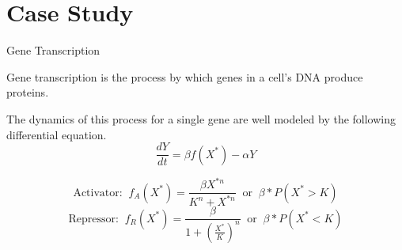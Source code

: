\documentclass{beamer}
\begin{document}
\section{Case Study}

\begin{frame}{Gene Transcription}
    \begin{large}
        Gene transcription is the process by which genes in a cell’s DNA produce proteins.

        \vspace*{0.125in}
        The dynamics of this process for a single gene are well modeled by the following differential equation.
        $$\frac{dY}{dt}=\beta f(X^*) - \alpha Y$$

        $$\text{Activator: } \ f_A(X^*)=\frac{\beta X^{*n}}{K^n + X^{*n}} \ \text{ or } \ \beta * P(X^* > K)$$
        $$\text{Repressor: } \ f_R(X^*)=\frac{\beta}{1 + \left(\frac{X^*}{K}\right)^n} \ \text{ or } \ \beta * P(X^* < K)$$

    \end{large}
\end{frame}
\end{document}
